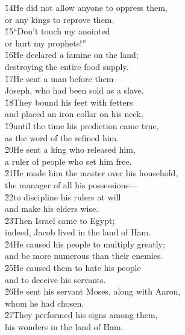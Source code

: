 \begin{poetry}
\poeml \v{14}He did not allow anyone to oppress them, \\
\poemll    or any kings to reprove them. \\
\poeml \v{15}``Don't touch my anointed \\
\poemll    or hurt my prophets!'' \\
\poeml \v{16}He declared a famine on the land; \\
\poemll    destroying the entire food supply. \\
\poeml \v{17}He sent a man before them--- \\
\poemll    Joseph, who had been sold as a slave. \\
\poeml \v{18}They bound his feet with fetters \\
\poemll    and placed an iron collar on his neck, \\
\poeml \v{19}until the time his prediction came true, \\
\poemll    as the word of the  refined him. \\
\poeml \v{20}He sent a king who released him, \\
\poemll    a ruler of people who set him free. \\
\poeml \v{21}He made him the master over his household, \\
\poemll    the manager of all his possessions--- \\
\poeml \v{22}to discipline his rulers at will \\
\poemll    and make his elders wise. \\
\poeml \v{23}Then Israel came to Egypt; \\
\poemll    indeed, Jacob lived in the land of Ham. \\
\poeml \v{24}He caused his people to multiply greatly; \\
\poemll    and be more numerous than their enemies. \\
\poeml \v{25}He caused them to hate his people \\
\poemll    and to deceive his servants. \\
\poeml \v{26}He sent his servant Moses, along with Aaron, \\
\poemll    whom he had chosen. \\
\poeml \v{27}They performed his signs among them, \\
\poemll    his wonders in the land of Ham. \\

\end{poetry}
